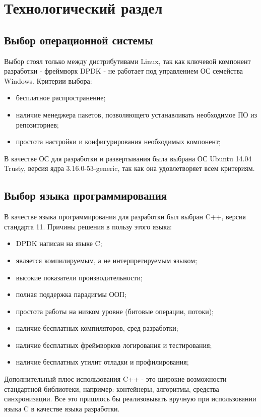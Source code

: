 \chapter{Технологический раздел}
\label{cha:impl}


\section{Выбор операционной системы}
Выбор стоял только между дистрибутивами Linux, так как ключевой компонент разработки - фреймворк DPDK - не работает под управлением ОС семейства Windows. Критерии выбора:
\begin{itemize}
\item бесплатное распространение;
\item наличие менеджера пакетов, позволяющего устанавливать необходимое ПО из репозиториев;
\item простота настройки и конфигурирования необходимых компонент;
\end{itemize}

В качестве ОС для разработки и развертывания была выбрана ОС Ubuntu 14.04 Trusty, версия ядра 3.16.0-53-generic, так как она удовлетворяет всем критериям.


\section{Выбор языка программирования}
В качестве языка программирования для разработки был выбран C++, версия стандарта 11. Причины решения в пользу этого языка:
\begin{itemize}
\item DPDK написан на языке C;
\item является компилируемым, а не интерпретируемым языком;
\item высокие показатели производительности;
\item полная поддержка парадигмы ООП;
\item простота работы на низком уровне (битовые операции, потоки);
\item наличие бесплатных компиляторов, сред разработки;
\item наличие бесплатных фреймворков логирования и тестирования;
\item наличие бесплатных утилит отладки и профилирования;
\end{itemize}

Дополнительный плюс использования C++ - это широкие возможности стандартной библиотеки, например: контейнеры, алгоритмы, средства синхронизации. Все это пришлось бы реализовывать вручную при использовании языка C в качестве языка разработки.



